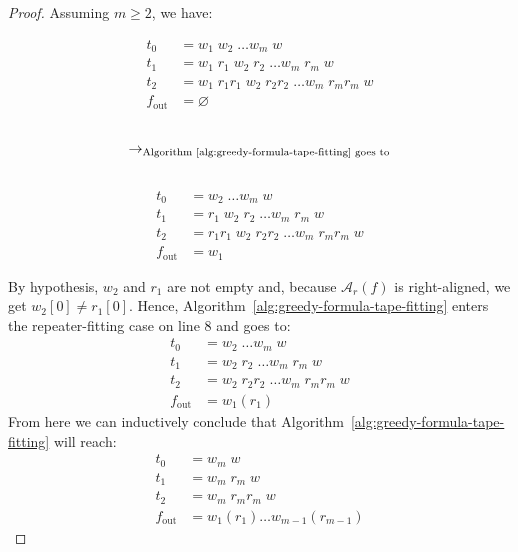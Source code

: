 \begin{proof}
    Assuming $m\geq 2$, we have:
    \setlength{\columnsep}{-1.9cm}
    \begin{multicols}{3}
        \noindent
        \begin{align*}
            t_0          & = w_1\; w_2\;\dots w_m\; w                              \\
            t_1          & = w_1\; r_1\; w_2\; r_2\; \dots w_m\; r_m\; w           \\
            t_2          & = w_1\; r_1r_1\; w_2\;  r_2r_2\; \dots w_m\; r_mr_m\; w \\
            f_\text{out} & = \varnothing
        \end{align*}
        \begin{align*}
             &                                                                   \\
            \to_{\text{Algorithm~\ref{alg:greedy-formula-tape-fitting} goes to}} \\
             &
        \end{align*}
        \begin{align*}
            t_0          & = w_2\;\dots w_m\; w                              \\
            t_1          & = r_1\; w_2\; r_2\; \dots w_m\; r_m\; w           \\
            t_2          & = r_1r_1\; w_2\;  r_2r_2\; \dots w_m\; r_mr_m\; w \\
            f_\text{out} & = w_1
        \end{align*}
    \end{multicols}
    By hypothesis, $w_2$ and $r_1$ are not empty and, because $\mathcal{A}_r(f)$ is right-aligned, we get $w_2[0] \neq r_1[0]$. Hence, Algorithm~\ref{alg:greedy-formula-tape-fitting} enters the repeater-fitting case on line 8 and goes to:
    \begin{align*}
        t_0          & = w_2\;\dots w_m\; w                     \\
        t_1          & = w_2\; r_2\; \dots w_m\; r_m\; w        \\
        t_2          & = w_2\;  r_2r_2\; \dots w_m\; r_mr_m\; w \\
        f_\text{out} & = w_1 (r_1)
    \end{align*}
    From here we can inductively conclude that Algorithm~\ref{alg:greedy-formula-tape-fitting} will reach:
    \begin{align*}
        t_0          & = w_m\; w                           \\
        t_1          & = w_m\; r_m\; w                     \\
        t_2          & = w_m\; r_mr_m\; w                  \\
        f_\text{out} & = w_1 (r_1) \dots w_{m-1} (r_{m-1})
    \end{align*}


\end{proof}
